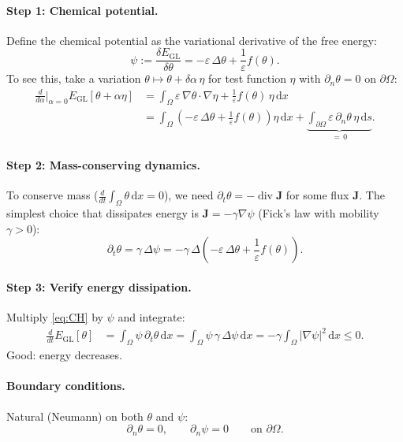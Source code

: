\documentclass[11pt,a4paper]{article}
\theoremstyle{definition}
\theoremstyle{remark}
\newcommand{\dd}{\,\mathrm{d}}
\newcommand{\dt}{\partial_t}
\newcommand{\dn}{\partial_n}
\newcommand{\dv}{\operatorname{div}}
\newcommand{\grad}{\nabla}
\newcommand{\eps}{\varepsilon}
\begin{document}
\paragraph{Step 1: Chemical potential.}
Define the chemical potential as the variational derivative of the free
energy:
\begin{equation}
  \label{eq:chem-potential}
  \psi := \frac{\delta E_{\mathrm{GL}}}{\delta \theta}
  = -\eps\,\Delta\theta + \frac{1}{\eps} f(\theta).
\end{equation}
To see this, take a variation $\theta \mapsto \theta + \delta\alpha\,\eta$
for test function $\eta$ with $\dn\theta = 0$ on $\partial\Omega$:
\begin{align*}
  \frac{d}{d\alpha}\bigg|_{\alpha=0} E_{\mathrm{GL}}[\theta + \alpha\eta]
  &= \int_\Omega \eps\,\grad\theta \cdot \grad\eta
     + \frac{1}{\eps} f(\theta)\,\eta \dd x \\
  &= \int_\Omega \left( -\eps\,\Delta\theta
     + \frac{1}{\eps} f(\theta) \right) \eta \dd x
     + \underbrace{\int_{\partial\Omega} \eps\,\dn\theta\,\eta \dd s}_{=\,0}.
\end{align*}

\paragraph{Step 2: Mass-conserving dynamics.}
To conserve mass ($\frac{d}{dt}\int_\Omega \theta \dd x = 0$), we need
$\dt\theta = -\dv \bm{J}$ for some flux $\bm{J}$. The simplest choice
that dissipates energy is $\bm{J} = -\gamma \grad\psi$ (Fick's law with
mobility $\gamma > 0$):
\begin{equation}
  \label{eq:CH}
  \dt\theta = \gamma\,\Delta\psi = -\gamma\,\Delta\!\left(
    -\eps\,\Delta\theta + \frac{1}{\eps} f(\theta)
  \right).
\end{equation}

\paragraph{Step 3: Verify energy dissipation.}
Multiply \eqref{eq:CH} by $\psi$ and integrate:
\begin{align}
  \frac{d}{dt} E_{\mathrm{GL}}[\theta]
  &= \int_\Omega \psi\,\dt\theta \dd x
  = \int_\Omega \psi\,\gamma\,\Delta\psi \dd x
  = -\gamma \int_\Omega |\grad\psi|^2 \dd x \leq 0.
  \label{eq:CH-dissipation}
\end{align}
Good: energy decreases.

\paragraph{Boundary conditions.}
Natural (Neumann) on both $\theta$ and $\psi$:
\begin{equation}
  \label{eq:CH-BC}
  \dn\theta = 0, \qquad \dn\psi = 0 \qquad \text{on } \partial\Omega.
\end{equation}
\end{document}
